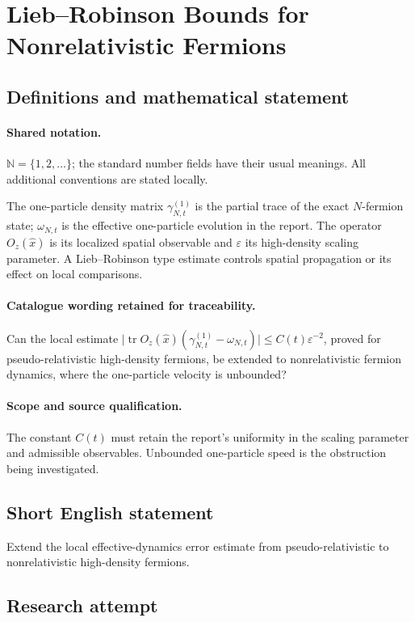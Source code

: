 \documentclass[11pt]{article}
\begin{document}
\section{Lieb–Robinson Bounds for Nonrelativistic Fermions}\label{statement}

\subsection{Definitions and mathematical statement}

\paragraph{Shared notation.}$\mathbb N=\{1,2,\ldots\}$; the standard number fields have their usual meanings. All additional conventions are stated locally.


The one-particle density matrix $\gamma^{(1)}_{N,t}$ is the partial trace of the exact $N$-fermion state; $\omega_{N,t}$ is the effective one-particle evolution in the report. The operator $O_z(\widehat x)$ is its localized spatial observable and $\varepsilon$ its high-density scaling parameter. A Lieb--Robinson type estimate controls spatial propagation or its effect on local comparisons.

\paragraph{Catalogue wording retained for traceability.}
Can the local estimate $\lvert\operatorname{tr} O_z(\widehat{x})(\gamma^{(1)}_{N,t}-\omega_{N,t})\rvert\leq C(t)\varepsilon^{-2}$, proved for pseudo-relativistic high-density fermions, be extended to nonrelativistic fermion dynamics, where the one-particle velocity is unbounded?

\paragraph{Scope and source qualification.}The constant $C(t)$ must retain the report's uniformity in the scaling parameter and admissible observables. Unbounded one-particle speed is the obstruction being investigated.
\subsection{Short English statement}
Extend the local effective-dynamics error estimate from pseudo-relativistic to nonrelativistic high-density fermions.
\subsection{Research attempt}
\end{document}
